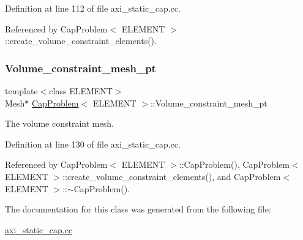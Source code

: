 Definition at line 112 of file axi\+\_\+static\+\_\+cap.\+cc.



Referenced by Cap\+Problem$<$ E\+L\+E\+M\+E\+N\+T $>$\+::create\+\_\+volume\+\_\+constraint\+\_\+elements().

\mbox{\label{classCapProblem_a4c6655c91412cb031cc2d06ab3ad40f9}} 
\subsubsection{\texorpdfstring{Volume\+\_\+constraint\+\_\+mesh\+\_\+pt}{Volume\_constraint\_mesh\_pt}}
{\footnotesize\ttfamily template$<$class E\+L\+E\+M\+E\+NT$>$ \\
Mesh$\ast$ \hyperlink{classCapProblem}{Cap\+Problem}$<$ E\+L\+E\+M\+E\+NT $>$\+::Volume\+\_\+constraint\+\_\+mesh\+\_\+pt\hspace{0.3cm}{\ttfamily [private]}}



The volume constraint mesh. 



Definition at line 130 of file axi\+\_\+static\+\_\+cap.\+cc.



Referenced by Cap\+Problem$<$ E\+L\+E\+M\+E\+N\+T $>$\+::\+Cap\+Problem(), Cap\+Problem$<$ E\+L\+E\+M\+E\+N\+T $>$\+::create\+\_\+volume\+\_\+constraint\+\_\+elements(), and Cap\+Problem$<$ E\+L\+E\+M\+E\+N\+T $>$\+::$\sim$\+Cap\+Problem().



The documentation for this class was generated from the following file\+:\begin{DoxyCompactItemize}
\item 
\hyperlink{axi__static__cap_8cc}{axi\+\_\+static\+\_\+cap.\+cc}\end{DoxyCompactItemize}
